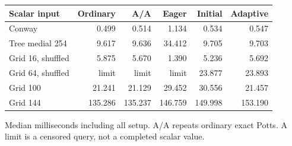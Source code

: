 \begin{center}\small
\begin{tabular}{@{}lrrrrr@{}}
\toprule
Scalar input & Ordinary & A/A & Eager & Initial & Adaptive \\
\midrule
Conway & 0.499 & 0.514 & 1.134 & 0.534 & 0.547 \\
Tree medial 254 & 9.617 & 9.636 & 34.412 & 9.705 & 9.703 \\
Grid 16, shuffled & 5.875 & 5.670 & 1.390 & 5.236 & 5.692 \\
Grid 64, shuffled & limit & limit & limit & 23.877 & 23.893 \\
Grid 100 & 21.241 & 21.129 & 29.452 & 30.556 & 21.457 \\
Grid 144 & 135.286 & 135.237 & 146.759 & 149.998 & 153.190 \\
\bottomrule
\end{tabular}
\end{center}
Median milliseconds including all setup. A/A repeats ordinary exact Potts. A limit is a censored query, not a completed scalar value.
